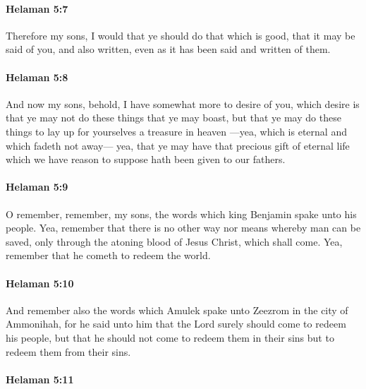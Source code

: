 		\paragraph{Helaman 5:7} %
			\label{HELAMAN-5-7}

			Therefore my sons, I would that ye should do that which is good,
			that it may be said of you, and also written,
			even as it has been said and written of them.

		\paragraph{Helaman 5:8} %
			\label{HELAMAN-5-8}

			And now my sons, behold, I have somewhat more to desire of you,
			which desire is that ye may not do these things that ye may boast,
			but that ye may do these things to lay up for yourselves a treasure in heaven
			---yea, which is eternal and which fadeth not away---
			yea, that ye may have that precious gift of eternal life
			which we have reason to suppose hath been given to our fathers.

		\paragraph{Helaman 5:9} %
			\label{HELAMAN-5-9}

			O remember, remember, my sons,
			the words which king Benjamin spake unto his people.
			Yea, remember that there is no other way nor means whereby man can be saved,
			only through the atoning blood of Jesus Christ, which shall come.
			Yea, remember that he cometh to redeem the world.

		\paragraph{Helaman 5:10} %
			\label{HELAMAN-5-10}

			And remember also the words
			which Amulek spake unto Zeezrom in the city of Ammonihah,
			for he said unto him that the Lord surely should come to redeem his people,
			but that he should not come to redeem them in their sins
			but to redeem them from their sins.

		\paragraph{Helaman 5:11} %
			\label{HELAMAN-5-11}

